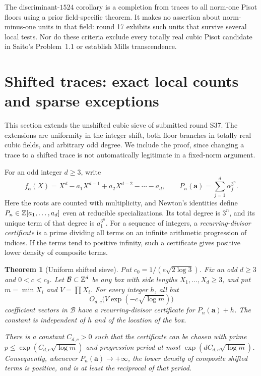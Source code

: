 \documentclass[11pt,a4paper]{article}
\newtheorem{theorem}{Theorem}[section]
\theoremstyle{definition}\newtheorem{definition}[theorem]{Definition}
\theoremstyle{remark}\newtheorem{remark}[theorem]{Remark}
\begin{document}
The discriminant-$1524$ corollary is a completion from traces to
all norm-one Pisot floors using a prior field-specific theorem.
It makes no assertion about norm-minus-one units in that field:
round 17 exhibits such units that survive several local tests.
Nor do these criteria exclude every totally real cubic Pisot
candidate in Saito's Problem~1.1 or establish Mills transcendence.

\section{Shifted traces: exact local counts and sparse exceptions}\label{pis:sec:density}
This section extends the unshifted cubic sieve of submitted round
S37. The extensions are uniformity in the integer shift, both floor
branches in totally real cubic fields, and arbitrary odd degree. We
include the proof, since changing a trace to a shifted trace is not
automatically legitimate in a fixed-norm argument.

For an odd integer $d\ge3$, write
\[
 f_{\mathbf a}(X)=X^d-a_1X^{d-1}+a_2X^{d-2}-\cdots-a_d,
 \qquad P_n(\mathbf a)=\sum_{j=1}^d\alpha_j^{3^n}.
\]
Here the roots are counted with multiplicity, and Newton's identities
define $P_n\in\mathbb Z[a_1,\ldots,a_d]$ even at reducible specializations.
Its total degree is $3^n$, and its unique term of that degree is
$a_1^{3^n}$. For a sequence of integers, a \emph{recurring-divisor
certificate} is a prime dividing all terms on an infinite arithmetic
progression of indices. If the terms tend to positive infinity, such
a certificate gives positive lower density of composite terms.

\begin{theorem}[Uniform shifted sieve]\label{pis:thm:shiftedsieve}
Put $c_0=1/(e\sqrt{2\log3})$. Fix an odd $d\ge3$ and $0<c<c_0$.
Let $\mathcal B\subset\mathbb Z^d$ be any box with side lengths
$X_1,\ldots,X_d\ge3$, and put $m=\min X_i$ and $V=\prod X_i$.
For every integer $h$, all but
\begin{equation}\label{pis:eq:exceptionbound}
 O_{d,c}\bigl(V\exp(-c\sqrt{\log m})\bigr)
\end{equation}
coefficient vectors in $\mathcal B$ have a recurring-divisor
certificate for $P_n(\mathbf a)+h$. The constant is independent of
$h$ and of the location of the box.

There is a constant $C_{d,c}>0$ such that the certificate can be
chosen with prime $p\le\exp(C_{d,c}\sqrt{\log m})$ and progression
period at most $\exp(dC_{d,c}\sqrt{\log m})$. Consequently, whenever
$P_n(\mathbf a)\to+\infty$, the lower density of composite shifted
terms is positive, and is at least the reciprocal of that period.
\end{theorem}
\end{document}
